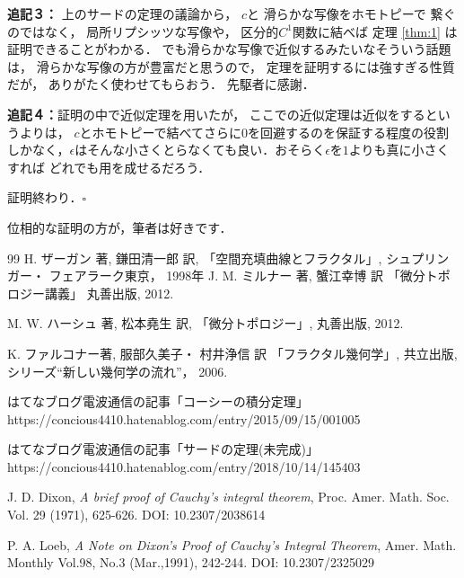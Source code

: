 \documentclass[leqno, a4paper, 12pt]{jsarticle}
\begin{document}
\textbf{追記３：}
上のサードの定理の議論から，
$c$と
滑らかな写像をホモトピーで
繋ぐのではなく，
局所リプシッツな写像や，
区分的$C^{1}$関数に結べば
定理
\ref{thm:1}
は証明できることがわかる．
でも滑らかな写像で近似するみたいなそういう話題は，
滑らかな写像の方が豊富だと思うので，
定理を証明するには強すぎる性質だが，
ありがたく使わせてもらおう．
先駆者に感謝．


\textbf{追記４：}証明の中で近似定理を用いたが，
ここでの近似定理は近似をするというよりは，
$c$とホモトピーで結べてさらに$0$を回避するのを保証する程度の役割しかなく，$\epsilon$はそんな小さくとらなくても良い．おそらく$\epsilon$を$1$よりも真に小さくすれば
どれでも用を成せるだろう．

証明終わり．$\square$



位相的な証明の方が，筆者は好きです．

\begin{thebibliography}{99}
H. ザーガン 著, 
鎌田清一郎 訳, 
「空間充填曲線とフラクタル」, 
シュプリンガー・
フェアラーク東京，
1998年
J. M. ミルナー 著, 
蟹江幸博 訳
「微分トポロジー講義」
丸善出版, 2012. 

M. W. ハーシュ 著, 
松本堯生 訳, 
「微分トポロジー」, 
丸善出版, 2012. 

K. ファルコナー著,  
服部久美子・ 村井浄信 訳
「フラクタル幾何学」, 
共立出版, 
シリーズ``新しい幾何学の流れ''，
2006. 

はてなブログ電波通信の記事「コーシーの積分定理」
https://concious4410.hatenablog.com/entry/2015/09/15/001005

はてなブログ電波通信の記事「サードの定理(未完成)」
https://concious4410.hatenablog.com/entry/2018/10/14/145403


J.  D. Dixon,
\textit{
A brief proof of Cauchy's integral theorem},
Proc. Amer. Math.  Soc. Vol. 29 (1971), 625-626. 
DOI: 10.2307/2038614

P.  A. 
Loeb, 
\textit{A Note on Dixon's Proof of Cauchy's Integral Theorem}, Amer.  Math. 
Monthly Vol.98, No.3 (Mar.,1991), 242-244. 
DOI: 10.2307/2325029
\end{thebibliography}
\end{document}
